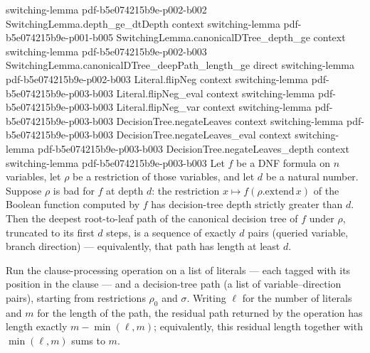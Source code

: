 \begin{lemma}
  {switching-lemma}
  {pdf-b5e074215b9e-p002-b002}
\proofstep
  {SwitchingLemma.depth_ge_dtDepth}
  {context}
  {switching-lemma}
  {pdf-b5e074215b9e-p001-b005}
\proofstep
  {SwitchingLemma.canonicalDTree_depth_ge}
  {context}
  {switching-lemma}
  {pdf-b5e074215b9e-p002-b003}
\proofstep
  {SwitchingLemma.canonicalDTree_deepPath_length_ge}
  {direct}
  {switching-lemma}
  {pdf-b5e074215b9e-p002-b003}
\proofstep
  {Literal.flipNeg}
  {context}
  {switching-lemma}
  {pdf-b5e074215b9e-p003-b003}
\proofstep
  {Literal.flipNeg_eval}
  {context}
  {switching-lemma}
  {pdf-b5e074215b9e-p003-b003}
\proofstep
  {Literal.flipNeg_var}
  {context}
  {switching-lemma}
  {pdf-b5e074215b9e-p003-b003}
\proofstep
  {DecisionTree.negateLeaves}
  {context}
  {switching-lemma}
  {pdf-b5e074215b9e-p003-b003}
\proofstep
  {DecisionTree.negateLeaves_eval}
  {context}
  {switching-lemma}
  {pdf-b5e074215b9e-p003-b003}
\proofstep
  {DecisionTree.negateLeaves_depth}
  {context}
  {switching-lemma}
  {pdf-b5e074215b9e-p003-b003}
Let $f$ be a DNF formula on $n$ variables, let $\rho$ be a restriction of those
variables, and let $d$ be a natural number. Suppose $\rho$ is bad for $f$ at depth $d$:
the restriction $x \mapsto f(\rho.\mathrm{extend}\,x)$ of the Boolean function computed
by $f$ has decision-tree depth strictly greater than $d$. Then the deepest root-to-leaf
path of the canonical decision tree of $f$ under $\rho$, truncated to its first $d$
steps, is a sequence of exactly $d$ pairs (queried variable, branch direction) —
equivalently, that path has length at least $d$.
\end{lemma}

\begin{lemma}
\label{SwitchingLemma.processClauseLits_path_length_eq}
\leanok
{}
Run the clause-processing operation on a list of literals — each tagged with its
position in the clause — and a decision-tree path (a list of variable–direction pairs),
starting from restrictions $\rho_0$ and $\sigma$. Writing $\ell$ for the number of
literals and $m$ for the length of the path, the residual path returned by the operation
has length exactly $m - \min(\ell, m)$; equivalently, this residual length together with
$\min(\ell, m)$ sums to $m$.
\end{lemma}

